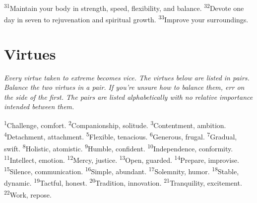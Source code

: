 \documentclass[openany,12pt,english]{book}
\newenvironment{para}{\par\pretolerance=100\tolerance=200\setlength{\emergencystretch}{0.6em}\relax}{\par}
\begin{document}
\begin{para}
    \textsuperscript{31}\thinspace{}Main\-tain your bod\-y in strength, speed, flex\-i\-bil\-i\-ty, and bal\-ance.
    \textsuperscript{32}\thinspace{}De\-vote one day in sev\-en to rejuvenation and spir\-it\-u\-al growth.
    \textsuperscript{33}\thinspace{}Im\-prove your sur\-round\-ings.
\end{para}

\section*{Virtues}

\begin{para}
    \begin{center}
        \itshape
        Eve\-ry vir\-tue tak\-en to ex\-treme becomes vi\-ce. The vir\-tues be\-low are list\-ed in pairs. Bal\-ance the two vir\-tues in a pair. If you're un\-sure how to bal\-ance them, err on the side of the first. The pairs are list\-ed al\-pha\-bet\-i\-cal\-ly with no rel\-a\-tive im\-por\-tance in\-tend\-ed be\-tween them.
    \end{center}
\end{para}


\begin{para}
    \textsuperscript{1}\thinspace{}Chal\-lenge, com\-fort.
    \textsuperscript{2}\thinspace{}Com\-pan\-ion\-ship, sol\-i\-tude.
    \textsuperscript{3}\thinspace{}Con\-tent\-ment, am\-bi\-tion.
    \textsuperscript{4}\thinspace{}De\-tach\-ment, at\-tach\-ment.
    \textsuperscript{5}\thinspace{}Flex\-i\-ble, te\-na\-cious.
    \textsuperscript{6}\thinspace{}Gen\-er\-ous, fru\-gal.
    \textsuperscript{7}\thinspace{}Grad\-u\-al, swift.
    \textsuperscript{8}\thinspace{}Ho\-lis\-tic, at\-om\-is\-tic.
    \textsuperscript{9}\thinspace{}Hum\-ble, con\-fi\-dent.
    \textsuperscript{10}\thinspace{}In\-de\-pend\-ence, con\-form\-i\-ty.
    \textsuperscript{11}\thinspace{}In\-tel\-lect, e\-mo\-tion.
    \textsuperscript{12}\thinspace{}Mer\-cy, jus\-tice.
    \textsuperscript{13}\thinspace{}O\-pen, guard\-ed.
    \textsuperscript{14}\thinspace{}Pre\-pare, im\-pro\-vise.
    \textsuperscript{15}\thinspace{}Si\-lence, com\-mu\-ni\-ca\-tion.
    \textsuperscript{16}\thinspace{}Sim\-ple, a\-bun\-dant.
    \textsuperscript{17}\thinspace{}So\-lem\-ni\-ty, hu\-mor.
    \textsuperscript{18}\thinspace{}Sta\-ble, dy\-nam\-ic.
    \textsuperscript{19}\thinspace{}Tact\-ful, hon\-est.
    \textsuperscript{20}\thinspace{}Tra\-di\-tion, in\-no\-va\-tion.
    \textsuperscript{21}\thinspace{}Tran\-quil\-i\-ty, ex\-cite\-ment.
    \textsuperscript{22}\thinspace{}Work, re\-pose.
\end{para}
\end{document}
